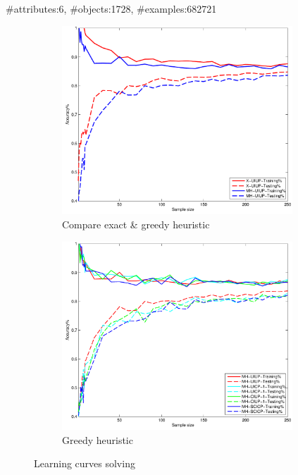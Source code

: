 {
	\begin{center}
		\#attributes:6, \#objects:1728, \#examples:682721
	\end{center}

  \begin{figure}
    \centering
    \begin{subfigure}[b]{0.48\textwidth}
      \centering
      \includegraphics[width=0.95\textwidth]{figs/PrefLearnResults/MatLabOutput/CarEvaluation_Trees_X_MH.pdf}
      \caption{Compare exact \& greedy heuristic}
    \end{subfigure}
    \begin{subfigure}[b]{0.48\textwidth}
      \centering
      \includegraphics[width=0.95\textwidth]{figs/PrefLearnResults/MatLabOutput/CarEvaluation_Trees_MH.pdf}
      \caption{Greedy heuristic}
    \end{subfigure}

    \caption{Learning curves solving }
  \end{figure}
}

